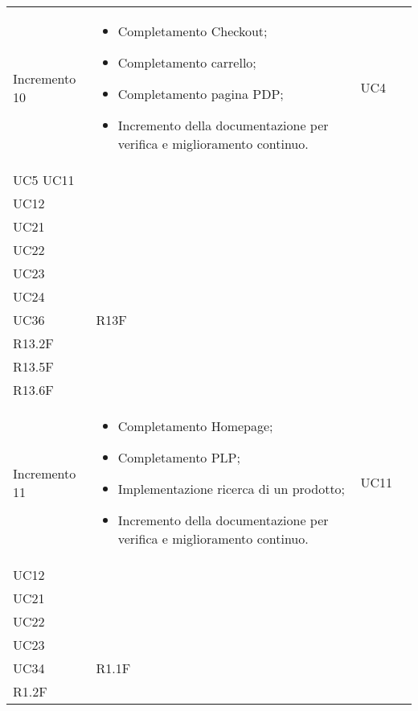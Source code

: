 \begin{longtable}{
    >{\centering}p{}
    >{\raggedright}p{}
    >{\centering}p{}
    >{\centering}p{}
    }
    Incremento 10                 & \vspace{-15px}
    \begin{itemize}
        \renewcommand\labelitemi{-}
        \item Completamento Checkout;
        \item Completamento carrello;
        \item Completamento pagina PDP;
        \item Incremento della documentazione per verifica e miglioramento continuo.
    \end{itemize}     & UC4                                                                                                                                                                                      \\ UC5 UC11                                                                                                                                                                                     \\ UC12 \\ UC21 \\ UC22 \\ UC23 \\ UC24 \\ UC36 & R13F  \\ R13.2F \\ R13.5F \\ R13.6F
    \tabularnewline
    Incremento 11                 & \vspace{-15px}
    \begin{itemize}
        \renewcommand\labelitemi{-}
        \item Completamento Homepage;
        \item Completamento PLP;
        \item Implementazione ricerca di un prodotto;
        \item Incremento della documentazione per verifica e miglioramento continuo.
    \end{itemize}     & UC11                                                                                                                                                                                     \\ UC12 \\ UC21 \\ UC22 \\ UC23 \\ UC34 & R1.1F \\ R1.2F

\end{longtable}
